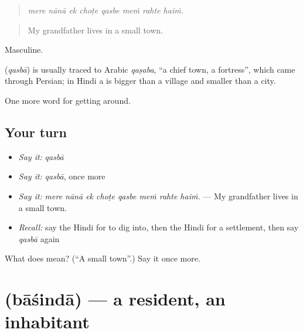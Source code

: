 \begin{quote}
       
\end{quote}

\begin{quote}
\emph{mere nānā ek choṭe qasbe meṁ rahte haiṁ.}
\end{quote}

\begin{quote}
My grandfather lives in a small town.
\end{quote}

Masculine.

\begin{cousinweb}
\textbf{} (\emph{qasbā}) is usually traced to Arabic \emph{qaṣaba}, \textquotedblleft{}a chief town, a fortress\textquotedblright{}, which came through Persian; in Hindi a  is bigger than a village and smaller than a city.
\end{cousinweb}

\begin{grammarlens}[title={What you've built}]
One more word for getting around.
\end{grammarlens}

\subsection*{Your turn}
\begin{itemize}
\raggedright
  \item \emph{Say it:} \emph{qasbā}
  \item \emph{Say it:} \emph{qasbā}, once more
  \item \emph{Say it:} \emph{mere nānā ek choṭe qasbe meṁ rahte haiṁ.} — My grandfather lives in a small town.
  \item \emph{Recall:} say the Hindi for to dig into, then the Hindi for a settlement, then say \emph{qasbā} again
\end{itemize}

\begin{tcolorbox}[breakable,colback=teal!4,colframe=teal!35!black,title={Before you move on}]
What does  mean? (\textquotedblleft{}A small town\textquotedblright{}.) Say it once more.
\end{tcolorbox}
\section[\texorpdfstring{\hi{बाशिंदा} (bāśindā)}{बाशिंदा (bāśindā)}]{ (bāśindā) — a resident, an inhabitant}

